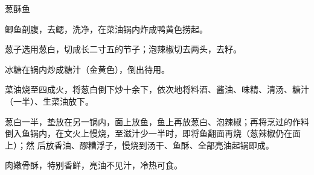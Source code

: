 %
%
%
%
%
%
%
\begin{recipe}{葱酥鱼}

\ingredients


\preparation

\step 鲫鱼剖腹，去鳃，洗净，在菜油锅内炸成鸭黄色捞起。

\step 葱子选用葱白，切成长二寸五的节子；泡辣椒切去两头，去籽。

\step 冰糖在锅内炒成糖汁（金黄色），倒出待用。

\step 菜油烧至四成火，将葱白倒下炒十余下，依次地将料酒、酱油、味精、清汤、糖汁
（一半）、生菜油放下。

\step 葱白一半，垫放在另一锅内，面上放鱼，鱼上再放葱白、泡辣椒；再将烹过的作料
倒入鱼锅内，在文火上慢烧，至滋汁少一半时，即将鱼翻面再烧（葱辣椒仍在面上）；然
后放香油、醪糟浮子，慢烧到汤干、鱼酥、全部亮油起锅即成。

\features

肉嫩骨酥，特别香鲜，亮油不见汁，冷热可食。

\end{recipe}


